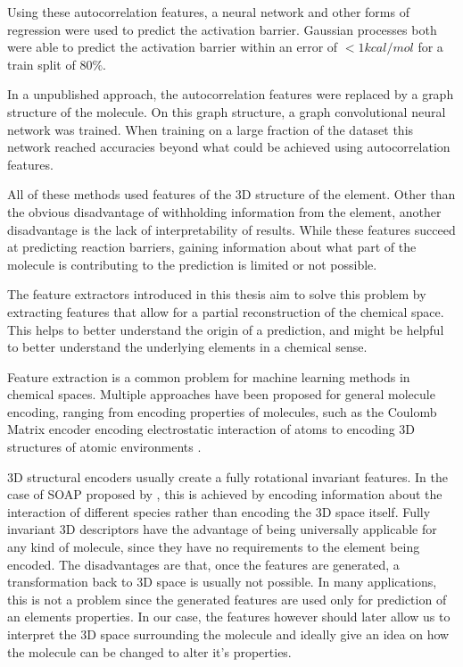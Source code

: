 Using these autocorrelation features, a neural network and other forms of regression were used to predict the activation barrier.
Gaussian processes both were able to predict the activation barrier within an error of $<1 kcal/mol$ for a train split of $80\%$.

In a unpublished approach, the autocorrelation features were replaced by a graph structure of the molecule.
On this graph structure, a graph convolutional neural network was trained.
When training on a large fraction of the dataset this network reached accuracies 
beyond what could be achieved using autocorrelation features.

All of these methods used features of the 3D structure of the element.
Other than the obvious disadvantage of withholding information from the element, another disadvantage is the lack of interpretability of results.
While these features succeed at predicting reaction barriers, gaining 
information about what part of the molecule is contributing to the prediction is limited or not possible.

The feature extractors introduced in this thesis aim to solve this problem by extracting features that allow for a
partial reconstruction of the chemical space.
This helps to better understand the origin of a prediction, and might be helpful to better understand 
the underlying elements in a chemical sense.

Feature extraction is a common problem for machine learning methods in chemical spaces.
Multiple approaches have been proposed for general molecule encoding, 
ranging from encoding properties of molecules, such as the Coulomb Matrix encoder encoding electrostatic interaction of atoms \cite{PhysRevLett.108.058301}
to encoding 3D structures of atomic environments \cite{Bart_k_2013}.

3D structural encoders usually create a fully rotational invariant features.
In the case of SOAP proposed by \citeauthor{Bart_k_2013}, this is achieved by encoding information about the interaction of 
different species rather than encoding the 3D space itself.
Fully invariant 3D descriptors have the advantage of being universally applicable for any kind of molecule, since they have no requirements to the element being encoded.
The disadvantages are that, once the features are generated, a transformation back to 3D space is usually not possible.
In many applications, this is not a problem since the generated features are used only for prediction of an elements properties.
In our case, the features however should later allow us to interpret the 3D space surrounding the molecule and ideally give an idea on how the molecule can be changed to alter it's properties.

